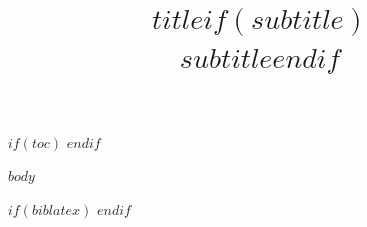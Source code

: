 \documentclass[12pt, a4paper]{article}
\title{\textbf{$title$}$if(subtitle)$\\[4pt]\large $subtitle$$endif$}
\title{}
\begin{document}
\maketitle
\thispagestyle{fancy}

$if(toc)$
\tableofcontents
\clearpage
$endif$

$body$

$if(biblatex)$
\newpage
\printbibliography
$endif$
\end{document}
